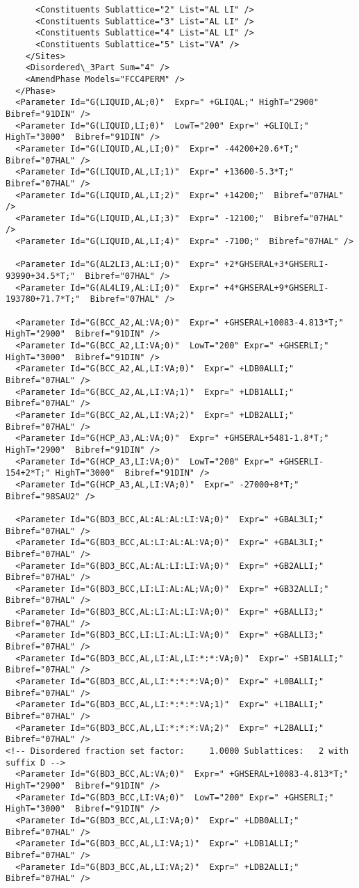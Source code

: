 \documentclass{article}
\begin{document}
\begin{appendices}
\begin{verbatim}
      <Constituents Sublattice="2" List="AL LI" />
      <Constituents Sublattice="3" List="AL LI" />
      <Constituents Sublattice="4" List="AL LI" />
      <Constituents Sublattice="5" List="VA" />
    </Sites>
    <Disordered\_3Part Sum="4" />
    <AmendPhase Models="FCC4PERM" />
  </Phase>
  <Parameter Id="G(LIQUID,AL;0)"  Expr=" +GLIQAL;" HighT="2900"  Bibref="91DIN" />
  <Parameter Id="G(LIQUID,LI;0)"  LowT="200" Expr=" +GLIQLI;" HighT="3000"  Bibref="91DIN" />
  <Parameter Id="G(LIQUID,AL,LI;0)"  Expr=" -44200+20.6*T;"  Bibref="07HAL" />
  <Parameter Id="G(LIQUID,AL,LI;1)"  Expr=" +13600-5.3*T;"  Bibref="07HAL" />
  <Parameter Id="G(LIQUID,AL,LI;2)"  Expr=" +14200;"  Bibref="07HAL" />
  <Parameter Id="G(LIQUID,AL,LI;3)"  Expr=" -12100;"  Bibref="07HAL" />
  <Parameter Id="G(LIQUID,AL,LI;4)"  Expr=" -7100;"  Bibref="07HAL" />

  <Parameter Id="G(AL2LI3,AL:LI;0)"  Expr=" +2*GHSERAL+3*GHSERLI-93990+34.5*T;"  Bibref="07HAL" />
  <Parameter Id="G(AL4LI9,AL:LI;0)"  Expr=" +4*GHSERAL+9*GHSERLI-193780+71.7*T;"  Bibref="07HAL" />

  <Parameter Id="G(BCC_A2,AL:VA;0)"  Expr=" +GHSERAL+10083-4.813*T;" HighT="2900"  Bibref="91DIN" />
  <Parameter Id="G(BCC_A2,LI:VA;0)"  LowT="200" Expr=" +GHSERLI;" HighT="3000"  Bibref="91DIN" />
  <Parameter Id="G(BCC_A2,AL,LI:VA;0)"  Expr=" +LDB0ALLI;"  Bibref="07HAL" />
  <Parameter Id="G(BCC_A2,AL,LI:VA;1)"  Expr=" +LDB1ALLI;"  Bibref="07HAL" />
  <Parameter Id="G(BCC_A2,AL,LI:VA;2)"  Expr=" +LDB2ALLI;"  Bibref="07HAL" />
  <Parameter Id="G(HCP_A3,AL:VA;0)"  Expr=" +GHSERAL+5481-1.8*T;" HighT="2900"  Bibref="91DIN" />
  <Parameter Id="G(HCP_A3,LI:VA;0)"  LowT="200" Expr=" +GHSERLI-154+2*T;" HighT="3000"  Bibref="91DIN" />
  <Parameter Id="G(HCP_A3,AL,LI:VA;0)"  Expr=" -27000+8*T;"  Bibref="98SAU2" />

  <Parameter Id="G(BD3_BCC,AL:AL:AL:LI:VA;0)"  Expr=" +GBAL3LI;"  Bibref="07HAL" />
  <Parameter Id="G(BD3_BCC,AL:LI:AL:AL:VA;0)"  Expr=" +GBAL3LI;"  Bibref="07HAL" />
  <Parameter Id="G(BD3_BCC,AL:AL:LI:LI:VA;0)"  Expr=" +GB2ALLI;"  Bibref="07HAL" />
  <Parameter Id="G(BD3_BCC,LI:LI:AL:AL;VA;0)"  Expr=" +GB32ALLI;"  Bibref="07HAL" />
  <Parameter Id="G(BD3_BCC,AL:LI:AL:LI:VA;0)"  Expr=" +GBALLI3;"  Bibref="07HAL" />
  <Parameter Id="G(BD3_BCC,LI:LI:AL:LI:VA;0)"  Expr=" +GBALLI3;"  Bibref="07HAL" />
  <Parameter Id="G(BD3_BCC,AL,LI:AL,LI:*:*:VA;0)"  Expr=" +SB1ALLI;"  Bibref="07HAL" />
  <Parameter Id="G(BD3_BCC,AL,LI:*:*:*:VA;0)"  Expr=" +L0BALLI;"  Bibref="07HAL" />
  <Parameter Id="G(BD3_BCC,AL,LI:*:*:*:VA;1)"  Expr=" +L1BALLI;"  Bibref="07HAL" />
  <Parameter Id="G(BD3_BCC,AL,LI:*:*:*:VA;2)"  Expr=" +L2BALLI;"  Bibref="07HAL" />
<!-- Disordered fraction set factor:     1.0000 Sublattices:   2 with suffix D -->
  <Parameter Id="G(BD3_BCC,AL:VA;0)"  Expr=" +GHSERAL+10083-4.813*T;" HighT="2900"  Bibref="91DIN" />
  <Parameter Id="G(BD3_BCC,LI:VA;0)"  LowT="200" Expr=" +GHSERLI;" HighT="3000"  Bibref="91DIN" />
  <Parameter Id="G(BD3_BCC,AL,LI:VA;0)"  Expr=" +LDB0ALLI;"  Bibref="07HAL" />
  <Parameter Id="G(BD3_BCC,AL,LI:VA;1)"  Expr=" +LDB1ALLI;"  Bibref="07HAL" />
  <Parameter Id="G(BD3_BCC,AL,LI:VA;2)"  Expr=" +LDB2ALLI;"  Bibref="07HAL" />


\end{verbatim}
\end{appendices}
\end{document}

